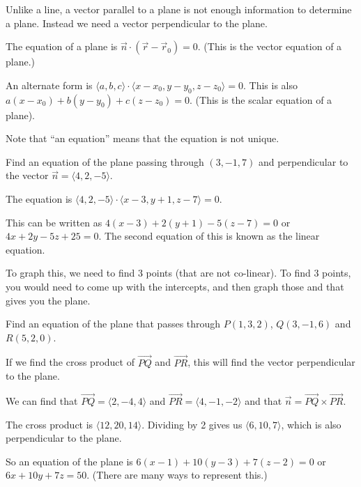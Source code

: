 \documentclass[../calc3.tex]{subfiles}
\begin{document}
Unlike a line, a vector parallel to a plane is not enough information to determine a plane. Instead we need a vector perpendicular to the plane.

The equation of a plane is $\vec{n}\cdot (\vec{r}-\vec{r}_0)=0$. (This is the vector equation of a plane.)

An alternate form is $\langle a,b,c\rangle\cdot \langle x-x_0,y-y_0,z-z_0\rangle =0$. This is also $a(x-x_0)+b(y-y_0)+c(z-z_0)=0$. (This is the scalar equation of a plane).

Note that ``an equation'' means that the equation is not unique.

\begin{example}
    Find an equation of the plane passing through $(3,-1,7)$ and perpendicular to the vector $\vec{n}=\langle 4,2,-5\rangle$.

    The equation is $\langle 4,2,-5\rangle \cdot \langle x-3,y+1,z-7\rangle =0$.

    This can be written as $4(x-3)+2(y+1)-5(z-7)=0$ or $4x+2y-5z+25=0$. The second equation of this is known as the linear equation.

    To graph this, we need to find 3 points (that are not co-linear). To find 3 points, you would need to come up with the intercepts, and then graph those and that gives you the plane.
\end{example}

\begin{example}
    Find an equation of the plane that passes through $P(1,3,2)$, $Q(3,-1,6)$ and $R(5,2,0)$.

    If we find the cross product of $\overrightarrow{PQ}$ and $\overrightarrow{PR}$, this will find the vector perpendicular to the plane.

    We can find that $\overrightarrow{PQ}=\langle 2,-4,4\rangle$ and $\overrightarrow{PR}=\langle 4,-1,-2\rangle$ and that $\vec{n}=\overrightarrow{PQ}\times \overrightarrow{PR}$.

    The cross product is $\langle 12,20,14\rangle$. Dividing by 2 gives us $\langle 6,10,7\rangle$, which is also perpendicular to the plane.

    So an equation of the plane is $6(x-1)+10(y-3)+7(z-2)=0$ or $6x+10y+7z=50$. (There are many ways to represent this.)
\end{example}
\end{document}
